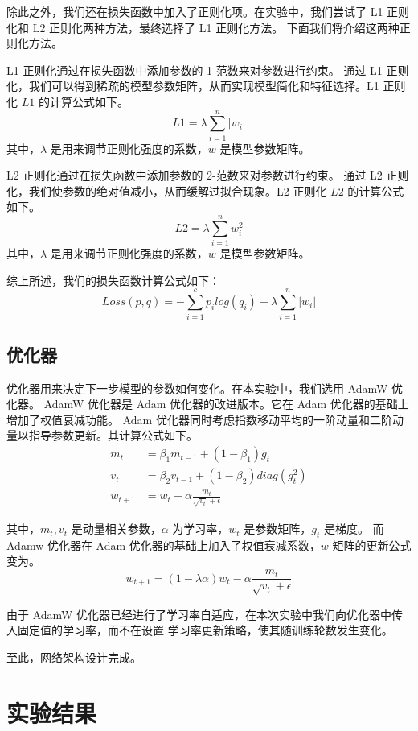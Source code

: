 \documentclass[supercite]{Experimental_Report}
\theoremstyle{definition}
\begin{document}
除此之外，我们还在损失函数中加入了正则化项。在实验中，我们尝试了 L1 正则化和 L2 正则化两种方法，最终选择了 L1 正则化方法。
下面我们将介绍这两种正则化方法。

L1 正则化通过在损失函数中添加参数的 1-范数来对参数进行约束。
通过 L1 正则化，我们可以得到稀疏的模型参数矩阵，从而实现模型简化和特征选择。L1 正则化 $L1$ 的计算公式如下。
$$
L1=\lambda \sum_{i=1}^n |w_i|
$$
其中，$\lambda$ 是用来调节正则化强度的系数，$w$ 是模型参数矩阵。

L2 正则化通过在损失函数中添加参数的 2-范数来对参数进行约束。
通过 L2 正则化，我们使参数的绝对值减小，从而缓解过拟合现象。L2 正则化 $L2$ 的计算公式如下。
$$
L2=\lambda \sum_{i=1}^n w_i^2
$$
其中，$\lambda$ 是用来调节正则化强度的系数，$w$ 是模型参数矩阵。

综上所述，我们的损失函数计算公式如下：
$$
Loss(p, q) = -\sum_{i=1}^{c}p_i log(q_i)+\lambda \sum_{i=1}^n |w_i|
$$

\subsection{优化器}
优化器用来决定下一步模型的参数如何变化。在本实验中，我们选用 AdamW 优化器。
AdamW 优化器是 Adam 优化器的改进版本。它在 Adam 优化器的基础上增加了权值衰减功能。
Adam 优化器同时考虑指数移动平均的一阶动量和二阶动量以指导参数更新。其计算公式如下。
$$
\begin{aligned}
	m_t&=\beta_1m_{t-1}+(1-\beta_1)g_t\\
	v_t&=\beta_2v_{t-1}+(1-\beta_2)diag(g_t^2)\\
	w_{t+1}&=w_{t}-\alpha\frac{m_t}{\sqrt{v_t}+\epsilon}
\end{aligned}
$$

其中，$m_t, v_t$ 是动量相关参数，$\alpha$ 为学习率，$w_t$ 是参数矩阵，$g_t$ 是梯度。
而 Adamw 优化器在 Adam 优化器的基础上加入了权值衰减系数，$w$ 矩阵的更新公式变为。
$$
w_{t+1}=(1-\lambda \alpha)w_{t}-\alpha\frac{m_t}{\sqrt{v_t}+\epsilon}
$$

由于 AdamW 优化器已经进行了学习率自适应，在本次实验中我们向优化器中传入固定值的学习率，而不在设置
学习率更新策略，使其随训练轮数发生变化。

至此，网络架构设计完成。


\section{实验结果}
\end{document}
